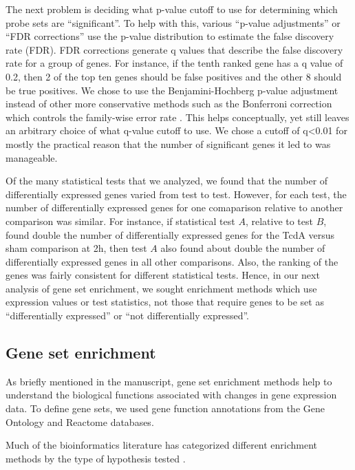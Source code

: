 The next problem is deciding what p-value cutoff to use for determining which
probe sets are ``significant''. To help with this, various ``p-value adjustments'' or
``FDR corrections'' use the p-value distribution to estimate the false discovery
rate (FDR). FDR corrections generate q values that describe the false discovery
rate for a group of genes. For instance, if the tenth ranked gene has a q value of 0.2, then
2 of the top ten genes should be false positives and the other 8 should be true
positives. We chose to use the Benjamini-Hochberg p-value adjustment
instead of other more conservative methods such as the Bonferroni correction which
controls the family-wise error rate \cite{Benjamini:1995ws}. This 
helps conceptually, yet still leaves an arbitrary choice of 
what q-value cutoff to use. We chose a cutoff of q\textless{}0.01 for mostly the practical
reason that the number of significant genes it led to was manageable.

Of the many statistical tests that we analyzed, we found that the number of
differentially expressed genes varied from test to test. However, for each test,
the number of differentially expressed genes for one comaparison relative to
another comparison was similar. For instance,
if statistical test $A$, relative to test $B$, found double the number of differentially expressed genes
for the TcdA versus sham comparison at 2h, then test $A$ also found about double the number of
differentially expressed genes in all other comparisons. Also,
the ranking of the genes was fairly consistent for different statistical tests.
Hence, in our next analysis of gene set enrichment, we sought enrichment
methods which use expression values or test statistics, not those that require 
genes to be set as ``differentially expressed'' or ``not differentially expressed''.

\subsection{Gene set enrichment}

As briefly mentioned in the manuscript, gene set enrichment methods help to 
understand the biological functions associated with changes in gene expression
data. To define gene sets, we used gene function annotations from the Gene 
Ontology and Reactome databases.

Much of the bioinformatics literature has categorized
different enrichment methods by the type of hypothesis tested \cite{Ackermann:2009bw}.

